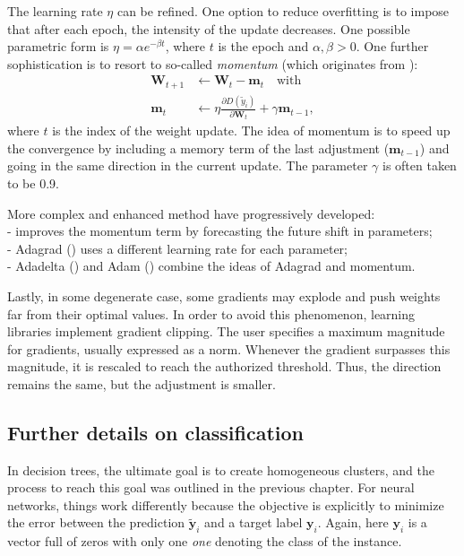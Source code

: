 \documentclass[]{krantz}
\theoremstyle{definition}
\theoremstyle{definition}
\theoremstyle{definition}
\theoremstyle{remark}
\begin{document}
The learning rate \(\eta\) can be refined. One option to reduce
overfitting is to impose that after each epoch, the intensity of the
update decreases. One possible parametric form is
\(\eta=\alpha e^{- \beta t}\), where \(t\) is the epoch and
\(\alpha,\beta>0\). One further sophistication is to resort to so-called
\emph{momentum} (which originates from \citet{polyak1964some}):
\begin{align}
\label{eq:gradmom}
\textbf{W}_{t+1} & \leftarrow  \textbf{W}_{t} - \textbf{m}_t \quad \text{with} \nonumber \\
 \textbf{m}_t & \leftarrow \eta  \frac{\partial D(\tilde{y}_i)}{\partial \textbf{W}_{t}}+\gamma \textbf{m}_{t-1},
\end{align} where \(t\) is the index of the weight update. The idea of
momentum is to speed up the convergence by including a memory term of
the last adjustment (\(\textbf{m}_{t-1}\)) and going in the same
direction in the current update. The parameter \(\gamma\) is often taken
to be 0.9.

More complex and enhanced method have progressively developed:\\
- \citet{nesterov1983method} improves the momentum term by forecasting
the future shift in parameters;\\
- Adagrad (\citet{duchi2011adaptive}) uses a different learning rate for
each parameter;\\
- Adadelta (\citet{zeiler2012adadelta}) and Adam
(\citet{kingma2014adam}) combine the ideas of Adagrad and momentum.

Lastly, in some degenerate case, some gradients may explode and push
weights far from their optimal values. In order to avoid this
phenomenon, learning libraries implement gradient clipping. The user
specifies a maximum magnitude for gradients, usually expressed as a
norm. Whenever the gradient surpasses this magnitude, it is rescaled to
reach the authorized threshold. Thus, the direction remains the same,
but the adjustment is smaller.

\hypertarget{further-details-on-classification-1}{%
\subsection{Further details on
classification}\label{further-details-on-classification-1}}

In decision trees, the ultimate goal is to create homogeneous clusters,
and the process to reach this goal was outlined in the previous chapter.
For neural networks, things work differently because the objective is
explicitly to minimize the error between the prediction
\(\tilde{\textbf{y}}_i\) and a target label \(\textbf{y}_i\). Again,
here \(\textbf{y}_i\) is a vector full of zeros with only one \emph{one}
denoting the class of the instance.
\end{document}

